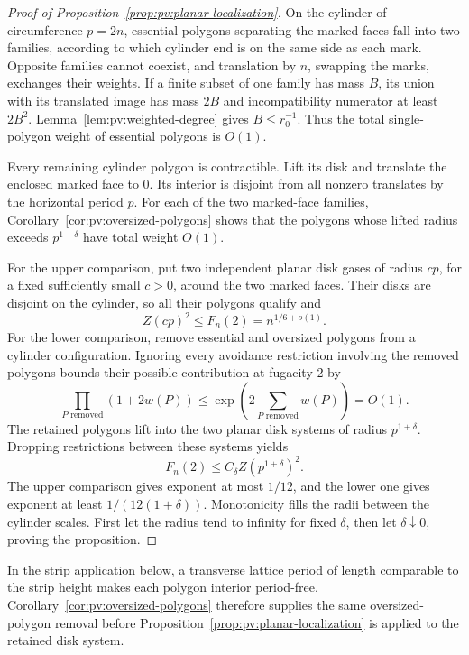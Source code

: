 \begin{proof}[Proof of Proposition~\ref{prop:pv:planar-localization}]
On the cylinder of circumference \(p=2n\), essential polygons separating
the marked faces fall into two families, according to which cylinder end
is on the same side as each mark. Opposite families cannot coexist, and
translation by \(n\), swapping the marks, exchanges their weights. If a
finite subset of one family has mass \(B\), its union with its translated
image has mass \(2B\) and incompatibility numerator at least \(2B^2\).
Lemma~\ref{lem:pv:weighted-degree} gives \(B\le r_0^{-1}\). Thus the total
single-polygon weight of essential polygons is \(O(1)\).

Every remaining cylinder polygon is contractible. Lift its disk and
translate the enclosed marked face to 0. Its interior is disjoint from all
nonzero translates by the horizontal period \(p\). For each of the two
marked-face families, Corollary~\ref{cor:pv:oversized-polygons} shows that
the polygons whose lifted radius exceeds \(p^{1+\delta}\) have total weight
\(O(1)\).

For the upper comparison, put two independent planar disk gases of radius
\(cp\), for a fixed sufficiently small \(c>0\), around the two marked
faces. Their disks are disjoint on the cylinder, so all their polygons
qualify and
\begin{equation}\label{eq:pv:disk-cylinder-upper}
 Z(cp)^2\le F_n(2)=n^{1/6+o(1)}.
\end{equation}
For the lower comparison, remove essential and oversized polygons from a
cylinder configuration. Ignoring every avoidance restriction involving the
removed polygons bounds their possible contribution at fugacity 2 by
\[
 \prod_{P\text{ removed}}(1+2w(P))
 \le \exp\left(2\sum_{P\text{ removed}}w(P)\right)=O(1).
\]
The retained polygons lift into the two planar disk systems of radius
\(p^{1+\delta}\). Dropping restrictions between these systems yields
\begin{equation}\label{eq:pv:disk-cylinder-lower}
 F_n(2)\le C_\delta Z(p^{1+\delta})^2.
\end{equation}
The upper comparison gives exponent at most \(1/12\), and the lower one
gives exponent at least \(1/(12(1+\delta))\). Monotonicity fills the radii
between the cylinder scales. First let the radius tend to infinity for
fixed \(\delta\), then let \(\delta\downarrow0\), proving the proposition.
\end{proof}

In the strip application below, a transverse lattice period of length
comparable to the strip height makes each polygon interior period-free.
Corollary~\ref{cor:pv:oversized-polygons} therefore supplies the same
oversized-polygon removal before Proposition~\ref{prop:pv:planar-localization}
is applied to the retained disk system.
